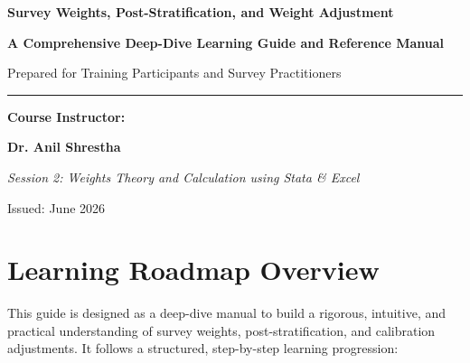 \documentclass[11pt,a4paper]{article}
\begin{document}
\begin{titlepage}
  \centering
  \vspace*{2cm}
  {\Huge\bfseries\color{primary} Survey Weights, Post-Stratification, and Weight Adjustment\par}
  \vspace{0.8cm}
  {\Large\bfseries\color{secondary} A Comprehensive Deep-Dive Learning Guide and Reference Manual\par}
  \vspace{0.5cm}
  {\large Prepared for Training Participants and Survey Practitioners\par}
  \vspace{1.5cm}
  \rule{\textwidth}{1.5pt}\par
  \vspace{1.5cm}
  {\large\bfseries Course Instructor:\par}
  {\Large\bfseries\color{primary} Dr. Anil Shrestha\par}
  \vspace{1.5cm}
  {\large\itshape Session 2: Weights Theory and Calculation using Stata \& Excel\par}
  \vfill
  {\large Issued: June 2026\par}
\end{titlepage}

\newpage
\tableofcontents
\newpage

\section*{Learning Roadmap Overview}
This guide is designed as a deep-dive manual to build a rigorous, intuitive, and practical understanding of survey weights, post-stratification, and calibration adjustments. It follows a structured, step-by-step learning progression:
\end{document}
